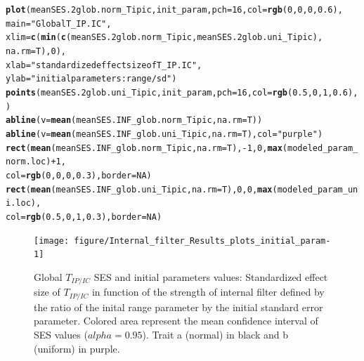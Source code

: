 \documentclass[12pt]{article}\usepackage[]{graphicx}\usepackage[]{color}
\makeatletter
\newcommand{\hlnum}[1]{\textcolor[rgb]{0.686,0.059,0.569}{#1}}%
\newcommand{\hlstr}[1]{\textcolor[rgb]{0.192,0.494,0.8}{#1}}%
\newcommand{\hlopt}[1]{\textcolor[rgb]{0,0,0}{#1}}%
\newcommand{\hlstd}[1]{\textcolor[rgb]{0.345,0.345,0.345}{#1}}%
\newcommand{\hlkwc}[1]{\textcolor[rgb]{0.333,0.667,0.333}{#1}}%
\newcommand{\hlkwd}[1]{\textcolor[rgb]{0.737,0.353,0.396}{\textbf{#1}}}%
\newenvironment{kframe}{%
 \def\at@end@of@kframe{}%
 \ifinner\ifhmode%
  \def\at@end@of@kframe{\end{minipage}}%
  \begin{minipage}{\columnwidth}%
 \fi\fi%
 \def\FrameCommand##1{\hskip\@totalleftmargin \hskip-\fboxsep
 \colorbox{shadecolor}{##1}\hskip-\fboxsep
     \hskip-\linewidth \hskip-\@totalleftmargin \hskip\columnwidth}%
 \MakeFramed {\advance\hsize-\width
   \@totalleftmargin\z@ \linewidth\hsize
   \@setminipage}}%
 {\par\unskip\endMakeFramed%
 \at@end@of@kframe}
\newenvironment{knitrout}{}{} %
\makeatother
\begin{document}
\begin{knitrout}\small
{}\color{fgcolor}\begin{kframe}
\begin{alltt}
\hlkwd{plot}\hlstd{(meanSES.2glob.norm_Tipic, init_param,} \hlkwc{pch} \hlstd{=} \hlnum{16}\hlstd{,} \hlkwc{col} \hlstd{=} \hlkwd{rgb}\hlstd{(}\hlnum{0}\hlstd{,} \hlnum{0}\hlstd{,} \hlnum{0}\hlstd{,} \hlnum{0.6}\hlstd{),}
     \hlkwc{main} \hlstd{=} \hlstr{"Global T_IP.IC"}\hlstd{,}
     \hlkwc{xlim} \hlstd{=} \hlkwd{c}\hlstd{(}\hlkwd{min}\hlstd{(}\hlkwd{c}\hlstd{(meanSES.2glob.norm_Tipic, meanSES.2glob.uni_Tipic),}
            \hlkwc{na.rm} \hlstd{= T),} \hlnum{0}\hlstd{),}
     \hlkwc{xlab} \hlstd{=} \hlstr{"standardized effect size of T_IP.IC"}\hlstd{,}
     \hlkwc{ylab} \hlstd{=} \hlstr{"initial parameters: range/sd"}\hlstd{)}
\hlkwd{points}\hlstd{(meanSES.2glob.uni_Tipic, init_param,} \hlkwc{pch} \hlstd{=} \hlnum{16}\hlstd{,} \hlkwc{col} \hlstd{=} \hlkwd{rgb}\hlstd{(}\hlnum{0.5}\hlstd{,} \hlnum{0}\hlstd{,} \hlnum{1}\hlstd{,} \hlnum{0.6}\hlstd{),)}
\hlkwd{abline}\hlstd{(}\hlkwc{v} \hlstd{=} \hlkwd{mean}\hlstd{(meanSES.INF_glob.norm_Tipic,} \hlkwc{na.rm} \hlstd{= T))}
\hlkwd{abline}\hlstd{(}\hlkwc{v} \hlstd{=} \hlkwd{mean}\hlstd{(meanSES.INF_glob.uni_Tipic,} \hlkwc{na.rm} \hlstd{= T),} \hlkwc{col} \hlstd{=} \hlstr{"purple"}\hlstd{)}
\hlkwd{rect}\hlstd{(}\hlkwd{mean}\hlstd{(meanSES.INF_glob.norm_Tipic,} \hlkwc{na.rm} \hlstd{= T),} \hlopt{-}\hlnum{1}\hlstd{,} \hlnum{0}\hlstd{,} \hlkwd{max}\hlstd{(modeled_param_norm.loc)} \hlopt{+} \hlnum{1}\hlstd{,}
     \hlkwc{col} \hlstd{=} \hlkwd{rgb}\hlstd{(}\hlnum{0}\hlstd{,} \hlnum{0}\hlstd{,} \hlnum{0}\hlstd{,} \hlnum{0.3}\hlstd{),} \hlkwc{border} \hlstd{=} \hlnum{NA}\hlstd{)}
\hlkwd{rect}\hlstd{(}\hlkwd{mean}\hlstd{(meanSES.INF_glob.uni_Tipic,} \hlkwc{na.rm} \hlstd{= T),} \hlnum{0}\hlstd{,} \hlnum{0}\hlstd{,} \hlkwd{max}\hlstd{(modeled_param_uni.loc),}
     \hlkwc{col} \hlstd{=} \hlkwd{rgb}\hlstd{(}\hlnum{0.5}\hlstd{,} \hlnum{0}\hlstd{,} \hlnum{1}\hlstd{,} \hlnum{0.3}\hlstd{),} \hlkwc{border} \hlstd{=} \hlnum{NA}\hlstd{)}
\end{alltt}
\end{kframe}\begin{figure}

{\centering \texttt{[image: figure/Internal\_filter\_Results\_plots\_initial\_param-1]} 

}

\caption[Global $T_{IP/IC}$ SES and initial parameters values]{Global $T_{IP/IC}$ SES and initial parameters values: Standardized effect size of $T_{IP/IC}$ in function of the strength of internal filter defined by the ratio of the inital range parameter by the initial standard error parameter. Colored area represent the mean confidence interval of SES values ($alpha = 0.95$). Trait a (normal) in black and b (uniform) in purple.\label{fig:Internal_filter_Results_plots_initial_param}}
\end{figure}


\end{knitrout}
\end{document}
